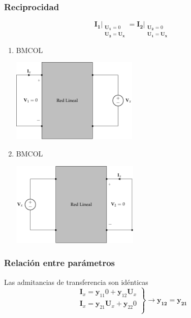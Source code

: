 \subsubsection{Reciprocidad}
\label{sec:orge3f94a7}

\[
\mathbf{I_1}\rvert_{
  \begin{array}{l}
\mathbf{U_1} = 0 \\ \mathbf{U_2} = \mathbf{U_x}
  \end{array}
} =%
\mathbf{I_2}\rvert_{
  \begin{array}{l}
\mathbf{U_2} = 0 \\ \mathbf{U_1} = \mathbf{U_x}
  \end{array}
}
\]

\begin{enumerate}
\item \hfill{}\textsc{BMCOL}
\label{sec:orgbafb0fe}

\includegraphics[height=4cm]{../figs/reciprocidadY_entrada.pdf}

\item \hfill{}\textsc{BMCOL}
\label{sec:orgb4d144b}

\includegraphics[height=4cm]{../figs/reciprocidadY_salida.pdf}

\end{enumerate}
\subsubsection{Relación entre parámetros}
\label{sec:org5379fea}
Las admitancias de transferencia son idénticas
\[
  \left.
    \begin{array}{l}
      \mathbf{I}_x = \mathbf{y}_{11} 0  + \mathbf{y}_{12} \mathbf{U}_x\\
      \mathbf{I}_x = \mathbf{y}_{21} \mathbf{U}_x + \mathbf{y}_{22} 0\\
    \end{array} \right\} \rightarrow \boxed{\mathbf{y_{12}} = \mathbf{y_{21}}}
\]

